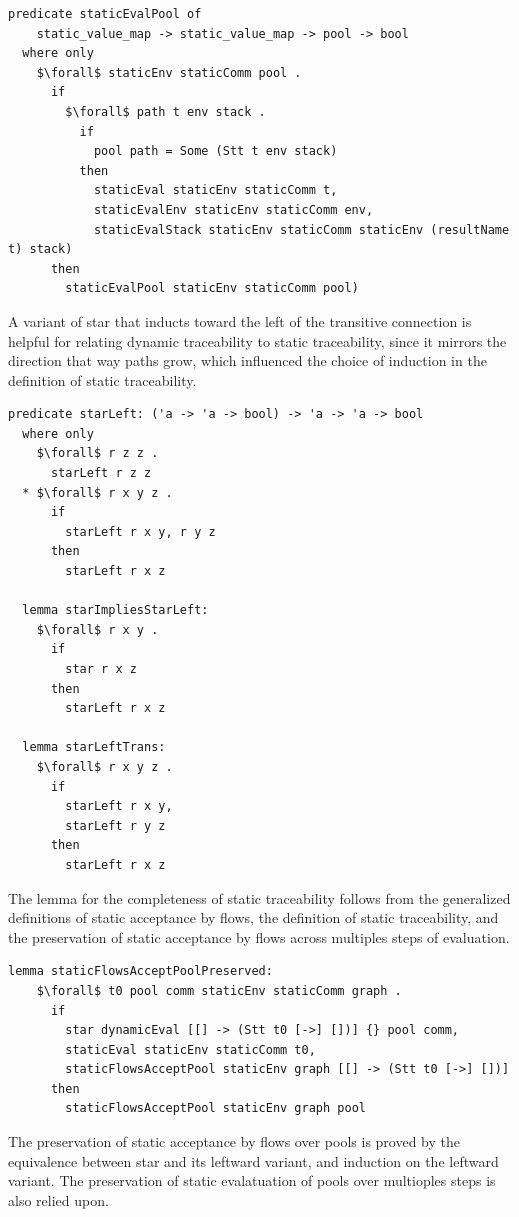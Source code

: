 \documentclass[letterpaper, 11pt]{extarticle}
\begin{document}
\begin{lstlisting}[language=logic, mathescape]
  predicate staticEvalPool of
    static_value_map -> static_value_map -> pool -> bool
  where only
    $\forall$ staticEnv staticComm pool .
      if
        $\forall$ path t env stack .
          if
            pool path = Some (Stt t env stack)
          then 
            staticEval staticEnv staticComm t,
            staticEvalEnv staticEnv staticComm env,
            staticEvalStack staticEnv staticComm staticEnv (resultName t) stack)
      then 
        staticEvalPool staticEnv staticComm pool)
  \end{lstlisting}


A variant of star that inducts toward the left of the transitive connection is helpful for
relating dynamic traceability to static traceability, since it mirrors the direction that way
paths grow, which influenced the choice of induction in the definition of static
traceability.

\begin{lstlisting}[language=logic, mathescape]
  predicate starLeft: ('a -> 'a -> bool) -> 'a -> 'a -> bool
  where only
    $\forall$ r z z .
      starLeft r z z
  * $\forall$ r x y z .
      if
        starLeft r x y, r y z
      then
        starLeft r x z

  lemma starImpliesStarLeft:
    $\forall$ r x y .
      if
        star r x z
      then
        starLeft r x z

  lemma starLeftTrans:
    $\forall$ r x y z .
      if 
        starLeft r x y,
        starLeft r y z 
      then
        starLeft r x z
\end{lstlisting}

The lemma for the completeness of static traceability follows from the generalized definitions
of static acceptance by flows, the definition of static traceability, and the preservation
of static acceptance by flows across multiples steps of evaluation.

\begin{lstlisting}[language=logic, mathescape]
  lemma staticFlowsAcceptPoolPreserved:
    $\forall$ t0 pool comm staticEnv staticComm graph .
      if
        star dynamicEval [[] -> (Stt t0 [->] [])] {} pool comm, 
        staticEval staticEnv staticComm t0,
        staticFlowsAcceptPool staticEnv graph [[] -> (Stt t0 [->] [])]
      then
        staticFlowsAcceptPool staticEnv graph pool 
\end{lstlisting}

The preservation of static acceptance by flows over pools is proved by the
equivalence between star and its leftward variant, and induction on the leftward variant.
The preservation of static evalatuation of pools over multioples steps is also relied upon.
\end{document}
